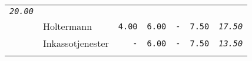 \documentclass[11pt,A4paper,]{article}
\begin{document}
\begin{longtable}[]{@{}llrrrrr@{}}
\begin{minipage}[t]{0.14\columnwidth}
\emph{\texttt{20.00}}\strut
\end{minipage}\tabularnewline
\begin{minipage}[t]{0.14\columnwidth}\raggedright\strut
\strut
\end{minipage} & \begin{minipage}[t]{0.14\columnwidth}\raggedright\strut
Holtermann\strut
\end{minipage} & \begin{minipage}[t]{0.14\columnwidth}\raggedleft\strut
\texttt{4.00}\strut
\end{minipage} & \begin{minipage}[t]{0.14\columnwidth}\raggedleft\strut
\texttt{6.00}\strut
\end{minipage} & \begin{minipage}[t]{0.14\columnwidth}\raggedleft\strut
\texttt{-}\strut
\end{minipage} & \begin{minipage}[t]{0.14\columnwidth}\raggedleft\strut
\texttt{7.50}\strut
\end{minipage} & \begin{minipage}[t]{0.14\columnwidth}\raggedleft\strut
\emph{\texttt{17.50}}\strut
\end{minipage}\tabularnewline
\begin{minipage}[t]{0.14\columnwidth}\raggedright\strut
\strut
\end{minipage} & \begin{minipage}[t]{0.14\columnwidth}\raggedright\strut
Inkassotjenester\strut
\end{minipage} & \begin{minipage}[t]{0.14\columnwidth}\raggedleft\strut
\texttt{-}\strut
\end{minipage} & \begin{minipage}[t]{0.14\columnwidth}\raggedleft\strut
\texttt{6.00}\strut
\end{minipage} & \begin{minipage}[t]{0.14\columnwidth}\raggedleft\strut
\texttt{-}\strut
\end{minipage} & \begin{minipage}[t]{0.14\columnwidth}\raggedleft\strut
\texttt{7.50}\strut
\end{minipage} & \begin{minipage}[t]{0.14\columnwidth}\raggedleft\strut
\emph{\texttt{13.50}}\strut
\end{minipage}\tabularnewline
\begin{minipage}[t]{0.14\columnwidth}\raggedright\strut

\end{minipage}
\end{longtable}
\end{document}
